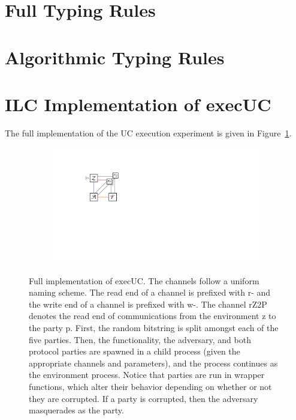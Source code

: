 \newpage

\appendix

\onecolumn

\section{Full Typing Rules}



\section{Algorithmic Typing Rules}





\newpage

\section{ILC Implementation of \textsf{execUC} }
\label{sec:full-execUC}
The full implementation of the UC execution experiment is given in Figure~\ref{fig:execUC}.

\begin{figure}[h]
\begin{subfigure}{.75\textwidth}

\end{subfigure}
\begin{subfigure}{0.24\textwidth}
\includegraphics[width=\linewidth]{graphics/execUC-colored}
\end{subfigure}
\caption{Full implementation of \textsf{execUC}. The channels follow a uniform
naming scheme. The read end of a channel is prefixed with \textsf{r-} and the
write end of a channel is prefixed with \textsf{w-}. The channel \textsf{rZ2P}
denotes the read end of communications from the environment \textsf{z} to the
party \textsf{p}. First, the random bitstring is split amongst each of the five
parties. Then, the functionality, the adversary, and both protocol parties are
spawned in a child process (given the appropriate channels and parameters), and
the process continues as the environment process. Notice that parties are run in
wrapper functions, which alter their behavior depending on whether or not they
are corrupted. If a party is corrupted, then the adversary masquerades as the
party.}
\label{fig:execUC}
\end{figure}
\newpage
\twocolumn


